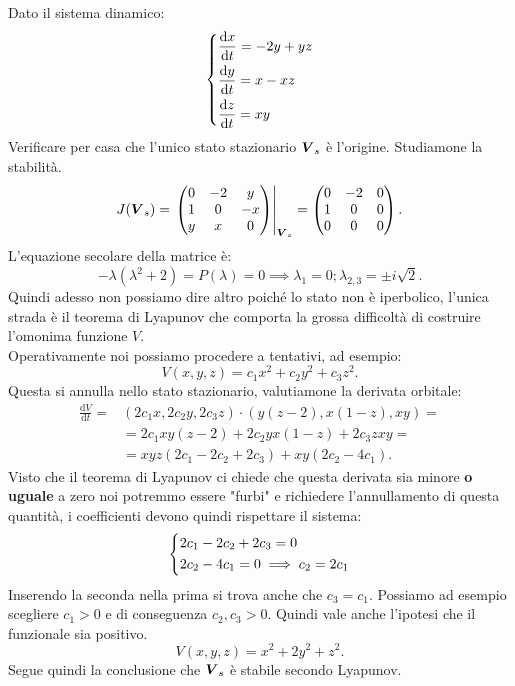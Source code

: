 \noindent
\begin{exmp}
   Dato il sistema dinamico:
   \[
   \begin{dcases}
   \frac{\text{d} x}{\text{d} t} = - 2y + yz\\
   \frac{\text{d} y}{\text{d} t} = x - xz\\
   \frac{\text{d} z}{\text{d} t} = xy 
   \end{dcases}
   \]
   Verificare per casa che l'unico stato stazionario $\boldsymbol{V}_s$ è l'origine. Studiamone la stabilità.
   \[
       J(\boldsymbol{V}_s) = 
       \left.
       \begin{pmatrix}
           0 & -2 & y \\
           1 & 0 & -x \\
           y & x & 0 \\
       \end{pmatrix}
       \right|_{\boldsymbol{V}_s}
       = 
       \begin{pmatrix}
           0 & -2 & 0 \\
           1 & 0 & 0 \\
           0 & 0 & 0 \\
       \end{pmatrix}
   .\] 
   L'equazione secolare della matrice è:
   \[
       -\lambda(\lambda^2 + 2) = P(\lambda) = 0 \implies  \lambda_1 = 0; \lambda_{2,3}=\pm i\sqrt{2} 
   .\] 
   Quindi adesso non possiamo dire altro poiché lo stato non è iperbolico, l'unica strada è il teorema di Lyapunov che comporta la grossa difficoltà di costruire l'omonima funzione $V$. \\
   Operativamente noi possiamo procedere a tentativi, ad esempio:
   \[
       V(x, y, z) = c_1x^2 + c_2y^2 + c_3z^2
   .\] 
   Questa si annulla nello stato stazionario, valutiamone la derivata orbitale:
   \[\begin{aligned}
       \frac{\text{d} V}{\text{d} t} =& (2c_1x, 2c_2y, 2c_3z) \cdot (y(z-2), x(1-z), xy) =\\
				      &=2c_1xy(z-2) + 2c_2yx(1-z) + 2c_3zxy =  \\
				      &= xyz(2c_1-2c_2+2c_3) + xy(2c_2-4c_1) 
   .\end{aligned}\]
   Visto che il teorema di Lyapunov ci chiede che questa derivata sia minore \textbf{o uguale} a zero noi potremmo essere "furbi" e richiedere l'annullamento di questa quantità, i coefficienti devono quindi rispettare il sistema:
   \[
   \begin{dcases}
   2c_1-2c_2+2c_3=0\\
   2c_2-4c_1=0 \implies  c_2 = 2c_1
   \end{dcases}
   \]
   Inserendo la seconda nella prima si trova anche che $c_3 = c_1$. Possiamo ad esempio scegliere $c_1 > 0$ e di conseguenza $c_2, c_3 > 0$. Quindi vale anche l'ipotesi che il funzionale sia positivo.
   \[
       V(x, y, z) = x^2 + 2y^2 + z^2
   .\] 
   Segue quindi la conclusione che $\boldsymbol{V}_s$ è stabile secondo Lyapunov.
\end{exmp}
